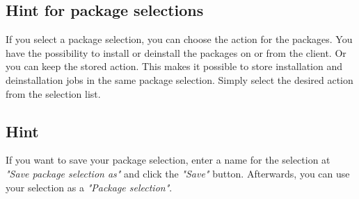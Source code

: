 \subsection{Hint for package selections}
If you select a package selection, you can choose the action for the packages. You have the possibility to install or deinstall the packages on or from the client. Or you can keep the stored action. This makes it possible to store installation and deinstallation jobs in the same package selection. Simply select the desired action from the selection list.\\
\subsection{Hint}
If you want to save your package selection, enter a name for the selection at \textit{"Save package selection as"} and click the \textit{"Save"} button. Afterwards, you can use your selection as a \textit{"Package selection"}.\\
